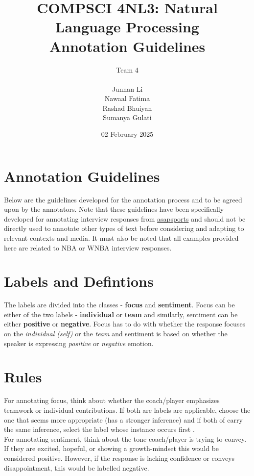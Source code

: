 \documentclass[titlepage]{article}
\title{COMPSCI 4NL3: Natural Language Processing\\
Annotation Guidelines}
\author{Team 4\\
\\ Junnan Li
\\ Nawaal Fatima
\\ Rashad Bhuiyan
\\ Sumanya Gulati}
\date{02 February 2025}
\begin{document}
\begin{titlepage}
  \maketitle
\end{titlepage}

\newpage

\section{Annotation Guidelines}
Below are the guidelines developed for the annotation process and to be agreed upon 
by the annotators. Note that these guidelines have been specifically developed for 
annotating interview responses from \href{https://asapsports.com/}{asapsports} and should not be directly used to
annotate other types of text before considering and adapting to relevant contexts and media. 
It must also be noted that all examples provided here are related to NBA or WNBA interview responses.

\section{Labels and Defintions}
The labels are divided into the classes - \textbf{focus} and \textbf{sentiment}. Focus can be either of 
the two labels - \textbf{individual} or \textbf{team} and similarly, sentiment can be either \textbf{positive} or \textbf{negative}. 
Focus has to do with whether the response focuses on the \emph{individual (self)} or the \emph{team} and 
sentiment is based on whether the speaker is expressing \emph{positive} or \emph{negative} emotion.

\section{Rules}
For annotating focus, think about whether the coach/player emphasizes teamwork or individual contributions. If both are labels are applicable,
choose the one that seems more appropriate (has a stronger inference) and if both of carry the same inference, select
the label whose instance occurs first . \\

For annotating sentiment, think about the tone coach/player is trying to convey. If they are excited, hopeful, or showing a 
growth-mindset this would be considered positive. However, if the response is lacking confidence or conveys disappointment, 
this would be labelled negative. \\
\end{document}
